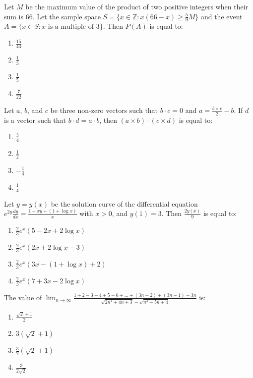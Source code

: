\iffalse
\title{25-01-2023}
\author{EE24BTECH11004}
\section{mcq-single}
\fi

\item Let $M$ be the maximum value of the product of two positive integers when their sum is 66. Let the sample space $S = \{ x \in \mathbb{Z} : x(66 - x) \geq \frac{5}{9}M \}$ and the event $A = \{ x \in S : x \text{ is a multiple of } 3 \}$. Then $P(A)$ is equal to:
\begin{enumerate}
    \item $\frac{15}{44}$
    \item $\frac{1}{3}$
    \item $\frac{1}{5}$
    \item $\frac{7}{22}$
\end{enumerate}

\item Let $a$, $b$, and $c$ be three non-zero vectors such that $b \cdot c = 0$ and $a = \frac{b \times c}{2} - b$. If $d$ is a vector such that $b \cdot d = a \cdot b$, then $(a \times b) \cdot (c \times d)$ is equal to:
            \begin{enumerate}
                \item $\frac{3}{4}$
                \item $\frac{1}{2}$
                \item $-\frac{1}{4}$
                \item $\frac{1}{4}$
            \end{enumerate}
        
\item Let $y = y(x)$ be the solution curve of the differential equation 
$e^{2y} \frac{dy}{dx} = \frac{1 + xy + (1 + \log x)}{x}$ 
with $x > 0$, and $y(1) = 3$. Then $\frac{2y(x)}{9}$ is equal to:

\begin{enumerate}
    \item $\frac{2}{3} e^x (5 - 2x + 2 \log x)$
    \item $\frac{2}{3} e^x (2x + 2 \log x - 3)$
    \item $\frac{2}{3} e^x (3x - (1 + \log x) + 2)$
    \item $\frac{2}{3} e^x (7 + 3x - 2 \log x)$
\end{enumerate}

\item The value of $\lim_{n \to \infty} \frac{1 + 2 - 3 + 4 + 5 - 6 + \dots + (3n - 2) + (3n - 1) - 3n}{\sqrt{2n^4 + 4n + 3} - \sqrt{n^4 + 5n + 4}}$ is:
    \begin{enumerate}
        \item $\frac{\sqrt{2} + 1}{2}$
        \item $3(\sqrt{2} + 1)$
        \item $\frac{3}{2} (\sqrt{2} + 1)$
        \item $\frac{3}{2\sqrt{2}}$
    \end{enumerate}

